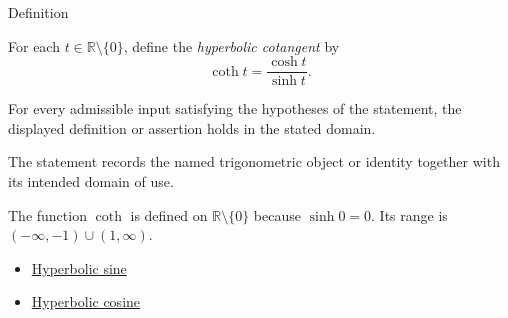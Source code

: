 

\begin{definitionbox}{Definition}
\begin{definition}
\label{def:hyperbolic-cotangent}
For each $t\in\mathbb{R}\setminus\{0\}$, define the \emph{hyperbolic
cotangent} by
\[
  \operatorname{coth} t=\frac{\cosh t}{\sinh t}.
\]
\end{definition}
\end{definitionbox}
\begin{remark*}
For every admissible input satisfying the hypotheses of the statement, the
displayed definition or assertion holds in the stated domain.
\end{remark*}

\begin{remark*}[Interpretation]
The statement records the named trigonometric object or identity together with
its intended domain of use.
\end{remark*}

\begin{remark*}
The function $\operatorname{coth}$ is defined on
$\mathbb{R}\setminus\{0\}$ because $\sinh 0=0$. Its range is
$(-\infty,-1)\cup(1,\infty)$.
\end{remark*}
\begin{dependencies}
\begin{itemize}
  \item \hyperref[def:hyperbolic-sine]{Hyperbolic sine}
  \item \hyperref[def:hyperbolic-cosine]{Hyperbolic cosine}
\end{itemize}
\end{dependencies}
